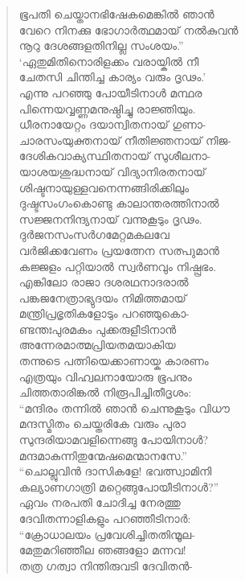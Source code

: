 \begin{verse}
ഭൂപതി ചെയ്താനഭിഷേകമെങ്കില്‍ ഞാന്‍\\
വേറെ നിനക്കു ഭോഗാര്‍ത്ഥമായ് നല്‍കുവന്‍\\
നൂറു ദേശങ്ങളതിനില്ല സംശയം.”\\
‘ഏതുമിതിനൊരിളക്കം വരായ്കില്‍ നീ\\
ചേതസി ചിന്തിച്ച കാര്യം വരും ദൃഢം.’\\
എന്നു പറഞ്ഞു പോയീടിനാള്‍ മന്ഥര\\
പിന്നെയവ്വണ്ണമനുഷ്ഠിച്ചു രാജ്ഞിയും.\\
ധീരനായേറ്റം ദയാന്വിതനായ് ഗുണാ-\\
ചാരസംയുക്തനായ് നീതിജ്ഞനായ് നിജ-\\
ദേശികവാക്യസ്ഥിതനായ് സുശീലനാ-\\
യാശയശുദ്ധനായ് വിദ്യാനിരതനായ്\\
ശിഷ്ടനായുള്ളവനെന്നങ്ങിരിക്കിലും\\
ദുഷ്ടസംഗംകൊണ്ടു കാലാന്തരത്തിനാല്‍\\
സജ്ജനനിന്ദ്യനായ് വന്നുകൂടും ദൃഢം.\\
ദുര്‍ജനസംസര്‍ഗമേറ്റമകലവേ\\
വര്‍ജിക്കവേണം പ്രയത്നേന സത്പുമാന്‍\\
കജ്ജളം പറ്റിയാല്‍ സ്വര്‍ണവും നിഷ്പ്രഭം.\\
എങ്കിലോ രാജാ ദശരഥനാദരാല്‍\\
പങ്കജനേത്രാഭ്യുദയം നിമിത്തമായ്\\
മന്ത്രിപ്രഭൃതികളോടും പറഞ്ഞുകൊ-\\
ണ്ടന്തഃപുരമകം പുക്കരുളീടിനാന്‍\\
അന്നേരമാത്മപ്രിയതമയാകിയ\\
തന്നുടെ പത്നിയെക്കാണായ്ക കാരണം\\
എത്രയും വിഹ്വലനായോരു ഭൂപനും\\
ചിത്തതാരിങ്കല്‍ നിരൂപിച്ചിതീദൃശം:\\
“മന്ദിരം തന്നില്‍ ഞാന്‍ ചെന്നുകൂടും വിധൗ\\
മന്ദസ്മിതം ചെയ്തരികേ വരും പുരാ\\
സുന്ദരിയാമവളിന്നെങ്ങു പോയിനാള്‍?\\
മന്ദമാകുന്നിതുന്മേഷമെന്മാനസേ.”\\
“ചൊല്ലുവിന്‍ ദാസികളേ! ഭവത്സ്വാമിനി\\
കല്യാണഗാത്രി മറ്റെങ്ങുപോയീടിനാള്‍?”\\
ഏവം നരപതി ചോദിച്ച നേരത്തു\\
ദേവിതന്നാളികളും പറഞ്ഞീടിനാര്‍:\\
“ക്രോധാലയം പ്രവേശിച്ചിതതിന്മൂല-\\
മേതുമറിഞ്ഞീല ഞങ്ങളോ മന്നവ!\\
തത്ര ഗത്വാ നിന്തിരുവടി ദേവിതന്‍-\\

\end{verse}

